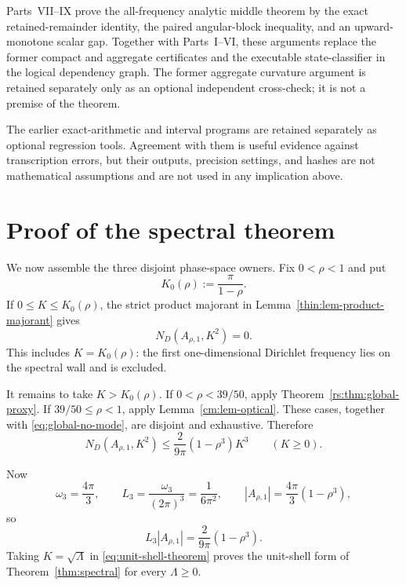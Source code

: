 \documentclass[11pt]{article}
\numberwithin{equation}{section}
\theoremstyle{definition}
\theoremstyle{remark}
\begin{document}
Parts~VII--IX prove the all-frequency analytic middle theorem by the exact
retained-remainder identity, the paired angular-block inequality, and an
upward-monotone scalar gap.  Together with Parts~I--VI, these arguments
replace the former compact and aggregate certificates and the executable
state-classifier in the logical dependency graph.  The former aggregate
curvature argument is retained separately only as an optional independent
cross-check; it is not a premise of the theorem.

The earlier exact-arithmetic and interval programs are retained separately
as optional regression tools.  Agreement with them is useful evidence
against transcription errors, but their outputs, precision settings, and
hashes are not mathematical assumptions and are not used in any implication
above.

\fi

\section{Proof of the spectral theorem}

We now assemble the three disjoint phase-space owners.  Fix
\(0<\rho<1\) and put
\[
 K_0(\rho):=\frac{\pi}{1-\rho}.
\]
If \(0\leq K\leq K_0(\rho)\), the strict product majorant in
Lemma~\ref{thin:lem-product-majorant} gives
\begin{equation}
 N_D(A_{\rho,1},K^2)=0.
 \label{eq:global-no-mode}
\end{equation}
This includes \(K=K_0(\rho)\): the first one-dimensional Dirichlet
frequency lies on the spectral wall and is excluded.

It remains to take \(K>K_0(\rho)\).  If
\(0<\rho<39/50\), apply
Theorem~\ref{rs:thm:global-proxy}.  If
\(39/50\leq\rho<1\), apply Lemma~\ref{cm:lem-optical}.  These cases,
together with \eqref{eq:global-no-mode}, are disjoint and exhaustive.
Therefore
\begin{equation}
  N_D(A_{\rho,1},K^2)
  \le\frac{2}{9\pi}(1-\rho^3)K^3
  \qquad(K\ge0).
  \label{eq:unit-shell-theorem}
\end{equation}

Now
\[
  \omega_3=\frac{4\pi}{3},
  \qquad
  L_3=\frac{\omega_3}{(2\pi)^3}=\frac1{6\pi^2},
  \qquad
  |A_{\rho,1}|=\frac{4\pi}{3}(1-\rho^3),
\]
so
\begin{equation}
  L_3|A_{\rho,1}|=\frac{2}{9\pi}(1-\rho^3).
  \label{eq:weyl-normalization}
\end{equation}
Taking \(K=\sqrt\Lambda\) in \eqref{eq:unit-shell-theorem} proves the
unit-shell form of Theorem~\ref{thm:spectral} for every \(\Lambda\ge0\).
\end{document}
